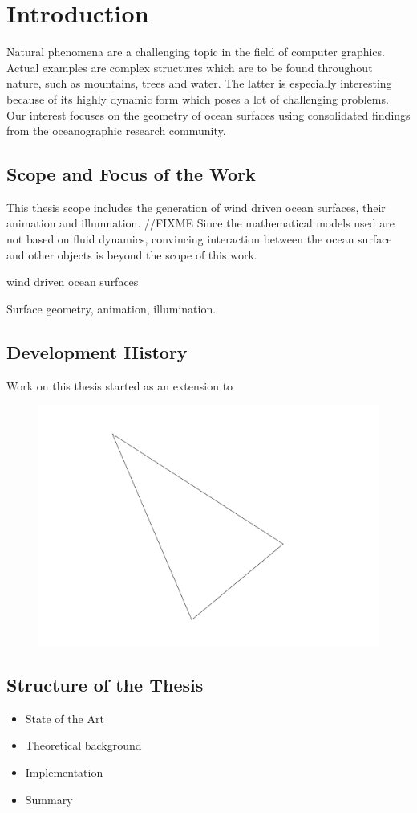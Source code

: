 \chapter{Introduction}

Natural phenomena are a challenging topic in the field of computer graphics.
Actual examples are complex structures which are to be found throughout nature,
such as mountains, trees and water. The latter is especially interesting
because of its highly dynamic form which poses a lot of challenging problems.
Our interest focuses on the geometry of ocean surfaces using
consolidated findings from the oceanographic research community.

\section{Scope and Focus of the Work}

This thesis scope includes the generation of wind driven ocean surfaces, their
animation and illumnation. //FIXME
Since the mathematical models used are not based on fluid dynamics,
convincing interaction between the ocean surface and other objects is beyond the
scope of this work.

wind driven ocean surfaces

Surface geometry, animation, illumination.

\section{Development History}

Work on this thesis started as an extension to \cite{thesis:rost}

\begin{figure}[p]
\begin{center}
\includegraphics[scale=1.0]{test.pdf}
\end{center}
\end{figure}

\section{Structure of the Thesis}

\begin{itemize}

\item State of the Art
\item Theoretical background
\item Implementation
\item Summary

\end{itemize}

